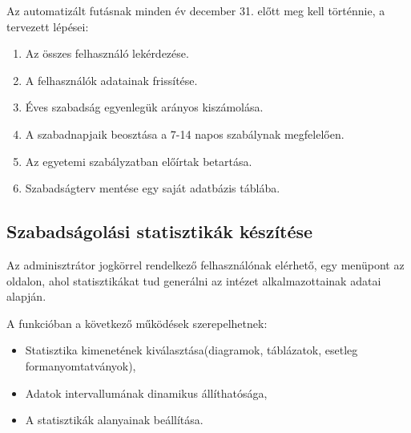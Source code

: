 Az automatizált futásnak minden év december 31. előtt meg kell történnie, a tervezett lépései:
\begin{enumerate}
	\item Az összes felhasználó lekérdezése.
	\item A felhasználók adatainak frissítése.
	\item Éves szabadság egyenlegük arányos kiszámolása.
	\item A szabadnapjaik beosztása a 7-14 napos szabálynak megfelelően.
	\item Az egyetemi szabályzatban előírtak betartása.
	\item Szabadságterv mentése egy saját adatbázis táblába.
\end{enumerate}
\subsection{Szabadságolási statisztikák készítése}
Az adminisztrátor jogkörrel rendelkező felhasználónak elérhető, egy menüpont az oldalon, ahol statisztikákat tud generálni az intézet alkalmazottainak adatai alapján.

A funkcióban a következő működések szerepelhetnek:
\begin{itemize}
	\item Statisztika kimenetének kiválasztása(diagramok, táblázatok, esetleg formanyomtatványok),
	\item Adatok intervallumának dinamikus állíthatósága,
	\item A statisztikák alanyainak beállítása.
\end{itemize}
